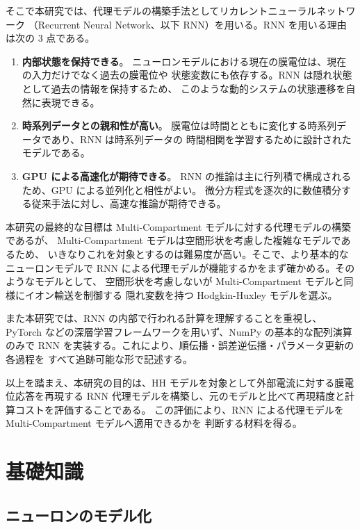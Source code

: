\documentclass[a4paper,11pt,openany]{ltjsreport}
\begin{document}
そこで本研究では、代理モデルの構築手法としてリカレントニューラルネットワーク
（Recurrent Neural Network、以下 RNN）を用いる。RNN を用いる理由は次の 3 点である。

\begin{enumerate}[label=(\arabic*)]
  \item \textbf{内部状態を保持できる}。
        ニューロンモデルにおける現在の膜電位は、現在の入力だけでなく過去の膜電位や
        状態変数にも依存する。RNN は隠れ状態として過去の情報を保持するため、
        このような動的システムの状態遷移を自然に表現できる。
  \item \textbf{時系列データとの親和性が高い}。
        膜電位は時間とともに変化する時系列データであり、RNN は時系列データの
        時間相関を学習するために設計されたモデルである。
  \item \textbf{GPU による高速化が期待できる}。
        RNN の推論は主に行列積で構成されるため、GPU による並列化と相性がよい。
        微分方程式を逐次的に数値積分する従来手法に対し、高速な推論が期待できる。
\end{enumerate}

本研究の最終的な目標は Multi-Compartment モデルに対する代理モデルの構築であるが、
Multi-Compartment モデルは空間形状を考慮した複雑なモデルであるため、
いきなりこれを対象とするのは難易度が高い。そこで、より基本的なニューロンモデルで
RNN による代理モデルが機能するかをまず確かめる。そのようなモデルとして、
空間形状を考慮しないが Multi-Compartment モデルと同様にイオン輸送を制御する
隠れ変数を持つ Hodgkin-Huxley モデルを選ぶ\cite{hodgkin1952}。

また本研究では、RNN の内部で行われる計算を理解することを重視し、
PyTorch などの深層学習フレームワークを用いず、NumPy の基本的な配列演算のみで
RNN を実装する。これにより、順伝播・誤差逆伝播・パラメータ更新の各過程を
すべて追跡可能な形で記述する。

以上を踏まえ、本研究の目的は、HH モデルを対象として外部電流に対する膜電位応答を再現する
RNN 代理モデルを構築し、元のモデルと比べて再現精度と計算コストを評価することである。
この評価により、RNN による代理モデルを Multi-Compartment モデルへ適用できるかを
判断する材料を得る。

\chapter{基礎知識}

\section{ニューロンのモデル化}
\end{document}
